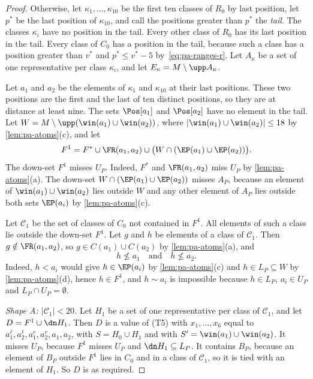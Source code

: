\begin{proof}
Otherwise, let $\kappa_1, \dots, \kappa_{10}$ be the first ten classes of $R_0$ by last position, let $p^*$ be the last position of $\kappa_{10}$, and call the positions greater than $p^*$ the \emph{tail}.
The classes $\kappa_i$ have no position in the tail.
Every other class of $R_0$ has its last position in the tail.
Every class of $C_0$ has a position in the tail, because such a class has a position greater than $v^*$ and $p^* \leq v^* - 5$ by~\eqref{eq:pa-ranges-r}.
Let $A_\kappa$ be a set of one representative per class $\kappa_i$, and let $E_\kappa = M \setminus \upp A_\kappa$.

Let $a_1$ and $a_2$ be the elements of $\kappa_1$ and $\kappa_{10}$ at their last positions.
These two positions are the first and the last of ten distinct positions, so they are at distance at least nine.
The sets $\Pos[a_1]$ and $\Pos[a_2]$ have no element in the tail.
Let $W = M \setminus \upp (\win(a_1) \cup \win(a_2))$, where $|\win(a_1) \cup \win(a_2)| \leq 18$ by \cref{lem:pa-atoms}(c), and let
\[
F^1 = F^* \cup \FR(a_1, a_2) \cup \bigl(W \cap (\EP(a_1) \cup \EP(a_2))\bigr).
\]
The down-set $F^1$ misses $U_P$.
Indeed, $F^*$ and $\FR(a_1, a_2)$ miss $U_P$ by \cref{lem:pa-atoms}(a).
The down-set $W \cap (\EP(a_1) \cup \EP(a_2))$ misses $A_P$, because an element of $\win(a_1) \cup \win(a_2)$ lies outside $W$ and any other element of $A_P$ lies outside both sets $\EP(a_i)$ by \cref{lem:pa-atoms}(c).

Let $\mathcal{C}_1$ be the set of classes of $C_0$ not contained in $F^1$.
All elements of such a class lie outside the down-set $F^1$.
Let $g$ and $h$ be elements of a class of $\mathcal{C}_1$.
Then $g \notin \FR(a_1, a_2)$, so $g \in C(a_1) \cup C(a_2)$ by \cref{lem:pa-atoms}(a), and
\begin{equation}
\label{eq:pa-not-below}
h \not\leq a_1 \quad\text{and}\quad h \not\leq a_2.
\end{equation}
Indeed, $h < a_i$ would give $h \in \EP(a_i)$ by \cref{lem:pa-atoms}(c) and $h \in L_P \subseteq W$ by \cref{lem:pa-atoms}(d), hence $h \in F^1$, and $h \sim a_i$ is impossible because $h \in L_P$, $a_i \in U_P$ and $L_P \cap U_P = \emptyset$.

\emph{Shape A: $|\mathcal{C}_1| < 20$.}
Let $H_1$ be a set of one representative per class of $\mathcal{C}_1$, and let $D = F^1 \cup \dn H_1$.
Then $D$ is a value of (T5) with $x_1, \dots, x_6$ equal to $a^\ell_1, a^\ell_2, a^r_1, a^r_2, a_1, a_2$, with $S = H_0 \cup H_1$ and with $S' = \win(a_1) \cup \win(a_2)$.
It misses $U_P$, because $F^1$ misses $U_P$ and $\dn H_1 \subseteq L_P$.
It contains $B_P$, because an element of $B_P$ outside $F^1$ lies in $C_0$ and in a class of $\mathcal{C}_1$, so it is tied with an element of $H_1$.
So $D$ is as required.


\end{proof}
